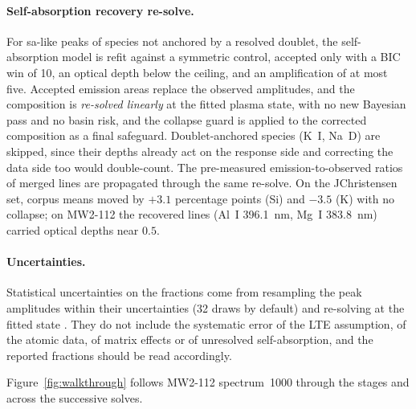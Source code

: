 \paragraph{Self-absorption recovery re-solve.}
For sa-like peaks of species not anchored by a resolved doublet, the self-absorption model
is refit against a symmetric control, accepted only with a BIC win of 10, an optical depth
below the ceiling, and an amplification of at most five.
Accepted emission areas replace the observed amplitudes, and the composition is
\emph{re-solved linearly} at the fitted plasma state, with no new Bayesian pass and no basin
risk, and the collapse guard is applied to the corrected composition as a final safeguard.
Doublet-anchored species (K~I, Na~D) are skipped, since their depths already act on the response side and correcting the data side too would double-count.
The pre-measured emission-to-observed ratios of merged lines are propagated through the same re-solve.
On the JChristensen set, corpus means moved by $+3.1$ percentage points (Si) and $-3.5$ (K) with no collapse; on MW2-112 the recovered lines (Al~I \SI{396.1}{nm}, Mg~I \SI{383.8}{nm}) carried optical depths near $0.5$.

\paragraph{Uncertainties.}
Statistical uncertainties on the fractions come from resampling the peak amplitudes within
their uncertainties (32 draws by default) and re-solving at the fitted state
\citep[cf.][]{efron1979bootstrap}.
They do not include the systematic error of the LTE assumption, of the atomic data, of matrix
effects or of unresolved self-absorption, and the reported fractions should be read
accordingly.

Figure~\ref{fig:walkthrough} follows MW2-112 spectrum~1000 through the stages and across the successive solves.

